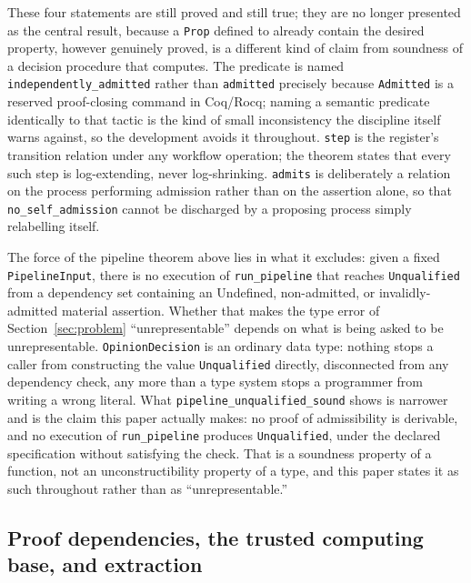 \documentclass[smallcondensed,envcountsect,natbib]{svjour3}
\newcommand{\state}[1]{\textsf{#1}}
\begin{document}
These four statements are still proved and still true; they are no longer presented as the central result, because a \texttt{Prop} defined to already contain the desired property, however genuinely proved, is a different kind of claim from soundness of a decision procedure that computes. The predicate is named \texttt{independently\_admitted} rather than \texttt{admitted} precisely because \texttt{Admitted} is a reserved proof-closing command in Coq/Rocq; naming a semantic predicate identically to that tactic is the kind of small inconsistency the discipline itself warns against, so the development avoids it throughout. \texttt{step} is the register's transition relation under any workflow operation; the theorem states that every such step is log-extending, never log-shrinking. \texttt{admits} is deliberately a relation on the process performing admission rather than on the assertion alone, so that \texttt{no\_self\_admission} cannot be discharged by a proposing process simply relabelling itself.

The force of the pipeline theorem above lies in what it excludes: given a fixed \texttt{PipelineInput}, there is no execution of \texttt{run\_pipeline} that reaches \texttt{Unqualified} from a dependency set containing an \state{Undefined}, non-admitted, or invalidly-admitted material assertion. Whether that makes the type error of Section~\ref{sec:problem} ``unrepresentable'' depends on what is being asked to be unrepresentable. \texttt{OpinionDecision} is an ordinary data type: nothing stops a caller from constructing the value \texttt{Unqualified} directly, disconnected from any dependency check, any more than a type system stops a programmer from writing a wrong literal. What \texttt{pipeline\_unqualified\_sound} shows is narrower and is the claim this paper actually makes: no proof of admissibility is derivable, and no execution of \texttt{run\_pipeline} produces \texttt{Unqualified}, under the declared specification without satisfying the check. That is a soundness property of a function, not an unconstructibility property of a type, and this paper states it as such throughout rather than as ``unrepresentable.''

\subsection*{Proof dependencies, the trusted computing base, and extraction}
\end{document}
